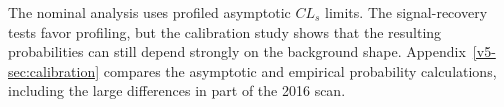 The nominal analysis uses profiled asymptotic $CL_s$ limits. The
signal-recovery tests favor profiling, but the calibration study shows
that the resulting probabilities can still depend strongly on the
background shape. Appendix~\ref{v5-sec:calibration} compares the
asymptotic and empirical probability calculations, including the large
differences in part of the 2016 scan.
